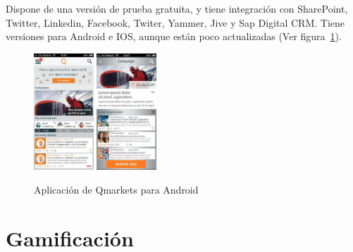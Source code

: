  Dispone de una versión de prueba gratuita, y tiene integración con SharePoint, Twitter, Linkedin, Facebook, Twiter, Yammer, Jive y Sap Digital CRM. Tiene versiones para Android e IOS, aunque están poco actualizadas (Ver figura~\ref{fig:qmarkets}).
 
 \begin{figure}[!h]
 	\begin{center}
 		\includegraphics[width=0.2\textwidth]{./img/competencia/qmarkets/1.jpg}
 		\includegraphics[width=0.2\textwidth]{./img/competencia/qmarkets/2.jpg}
 		\caption{Aplicación de Qmarkets para Android}
 		\label{fig:qmarkets}
 	\end{center}
 \end{figure}

\section{Gamificación}



